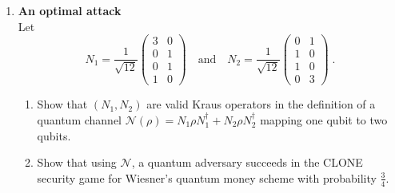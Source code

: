 \documentclass[12pt]{article}
\begin{document}
\begin{enumerate}
\item  {\bf An optimal attack}\label{ex:opt-wiesner}\\
Let 
\[ N_1 = \frac{1}{\sqrt{12}} \begin{pmatrix} 3 & 0 \\ 0 & 1 \\ 0 & 1 \\ 1 & 0 \end{pmatrix} \quad \text{and}\quad N_2 = \frac{1}{\sqrt{12}} \begin{pmatrix} 0 & 1 \\ 1 & 0 \\ 1 & 0 \\ 0 & 3\end{pmatrix}\;.\]
\begin{enumerate}
\item Show that $(N_1,N_2)$ are valid Kraus operators in the definition of a quantum channel $\mathcal{N}(\rho)=N_1\rho N_1^\dagger + N_2 \rho N_2^\dagger$ mapping one qubit to two qubits. 
\item Show that using $\mathcal{N}$, a quantum adversary succeeds in the CLONE security game for Wiesner's quantum money scheme with probability $\frac{3}{4}$. 
\end{enumerate}
\end{enumerate}
\end{document}
